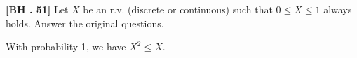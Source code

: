 
\begin{exercise}
	\textbf{[BH . 51]} Let $X$ be an r.v. (discrete or continuous) such that $0 \leq X \leq 1$ always holds. Answer the original questions.
	\begin{hint}
		With probability 1, we have $X^2 \leq X$.
	\end{hint}
\end{exercise}
